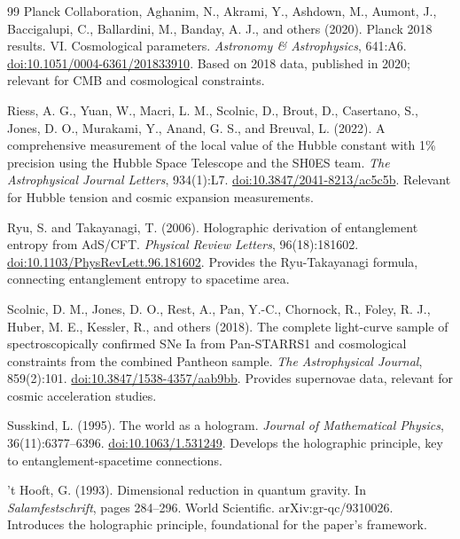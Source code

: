 \documentclass[11pt]{article}
\begin{document}
\begin{thebibliography}{99}
Planck Collaboration, Aghanim, N., Akrami, Y., Ashdown, M., Aumont, J., Baccigalupi, C., Ballardini, M., Banday, A. J., and others (2020).
\newblock Planck 2018 results. VI. Cosmological parameters.
\newblock \emph{Astronomy \& Astrophysics}, 641:A6.
\newblock \href{https://doi.org/10.1051/0004-6361/201833910}{doi:10.1051/0004-6361/201833910}.
\newblock Based on 2018 data, published in 2020; relevant for CMB and cosmological constraints.

Riess, A. G., Yuan, W., Macri, L. M., Scolnic, D., Brout, D., Casertano, S., Jones, D. O., Murakami, Y., Anand, G. S., and Breuval, L. (2022).
\newblock A comprehensive measurement of the local value of the Hubble constant with 1\% precision using the Hubble Space Telescope and the SH0ES team.
\newblock \emph{The Astrophysical Journal Letters}, 934(1):L7.
\newblock \href{https://doi.org/10.3847/2041-8213/ac5c5b}{doi:10.3847/2041-8213/ac5c5b}.
\newblock Relevant for Hubble tension and cosmic expansion measurements.

Ryu, S. and Takayanagi, T. (2006).
\newblock Holographic derivation of entanglement entropy from AdS/CFT.
\newblock \emph{Physical Review Letters}, 96(18):181602.
\newblock \href{https://doi.org/10.1103/PhysRevLett.96.181602}{doi:10.1103/PhysRevLett.96.181602}.
\newblock Provides the Ryu-Takayanagi formula, connecting entanglement entropy to spacetime area.

Scolnic, D. M., Jones, D. O., Rest, A., Pan, Y.-C., Chornock, R., Foley, R. J., Huber, M. E., Kessler, R., and others (2018).
\newblock The complete light-curve sample of spectroscopically confirmed SNe Ia from Pan-STARRS1 and cosmological constraints from the combined Pantheon sample.
\newblock \emph{The Astrophysical Journal}, 859(2):101.
\newblock \href{https://doi.org/10.3847/1538-4357/aab9bb}{doi:10.3847/1538-4357/aab9bb}.
\newblock Provides supernovae data, relevant for cosmic acceleration studies.

Susskind, L. (1995).
\newblock The world as a hologram.
\newblock \emph{Journal of Mathematical Physics}, 36(11):6377--6396.
\newblock \href{https://doi.org/10.1063/1.531249}{doi:10.1063/1.531249}.
\newblock Develops the holographic principle, key to entanglement-spacetime connections.

't Hooft, G. (1993).
\newblock Dimensional reduction in quantum gravity.
\newblock In \emph{Salamfestschrift}, pages 284--296. World Scientific.
\newblock arXiv:gr-qc/9310026.
\newblock Introduces the holographic principle, foundational for the paper’s framework.


\end{thebibliography}
\end{document}
